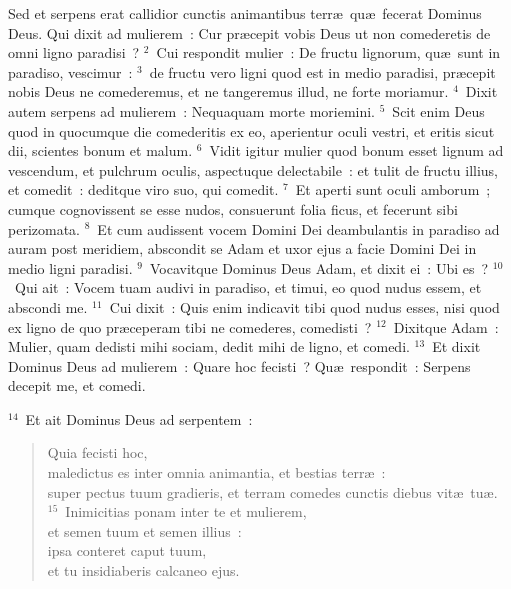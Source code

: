 \lettrine[lines=3,image=true,loversize=0.05,lraise=-0.03]{S}{}ed et serpens erat callidior cunctis animantibus terr\ae\ qu\ae\ fecerat Dominus Deus. Qui dixit ad mulierem~: Cur pr\ae cepit vobis Deus ut non comederetis de omni ligno paradisi~?
${}^{2}$~Cui respondit mulier~: De fructu lignorum, qu\ae\ sunt in paradiso, vescimur~:
${}^{3}$~de fructu vero ligni quod est in medio paradisi, pr\ae cepit nobis Deus ne comederemus, et ne tangeremus illud, ne forte moriamur.
${}^{4}$~Dixit autem serpens ad mulierem~: Nequaquam morte moriemini.
${}^{5}$~Scit enim Deus quod in quocumque die comederitis ex eo, aperientur oculi vestri, et eritis sicut dii, scientes bonum et malum.
${}^{6}$~Vidit igitur mulier quod bonum esset lignum ad vescendum, et pulchrum oculis, aspectuque delectabile~: et tulit de fructu illius, et comedit~: deditque viro suo, qui comedit.
${}^{7}$~Et aperti sunt oculi amborum~; cumque cognovissent se esse nudos, consuerunt folia ficus, et fecerunt sibi perizomata.
${}^{8}$~Et cum audissent vocem Domini Dei deambulantis in paradiso ad auram post meridiem, abscondit se Adam et uxor ejus a facie Domini Dei in medio ligni paradisi.
${}^{9}$~Vocavitque Dominus Deus Adam, et dixit ei~: Ubi es~?
${}^{10}$~Qui ait~: Vocem tuam audivi in paradiso, et timui, eo quod nudus essem, et abscondi me.
${}^{11}$~Cui dixit~: Quis enim indicavit tibi quod nudus esses, nisi quod ex ligno de quo pr\ae ceperam tibi ne comederes, comedisti~?
${}^{12}$~Dixitque Adam~: Mulier, quam dedisti mihi sociam, dedit mihi de ligno, et comedi.
${}^{13}$~Et dixit Dominus Deus ad mulierem~: Quare hoc fecisti~? Qu\ae\ respondit~: Serpens decepit me, et comedi.


${}^{14}$~Et ait Dominus Deus ad serpentem~: \begin{flushleft}\begin{verse}Quia fecisti hoc,\\ maledictus es inter omnia animantia, et bestias terr\ae~:\\ super pectus tuum gradieris, et terram comedes cunctis diebus vit\ae\ tu\ae .\\
${}^{15}$~Inimicitias ponam inter te et mulierem,\\ et semen tuum et semen illius~:\\ ipsa conteret caput tuum,\\ et tu insidiaberis calcaneo ejus.\end{verse}\end{flushleft}


